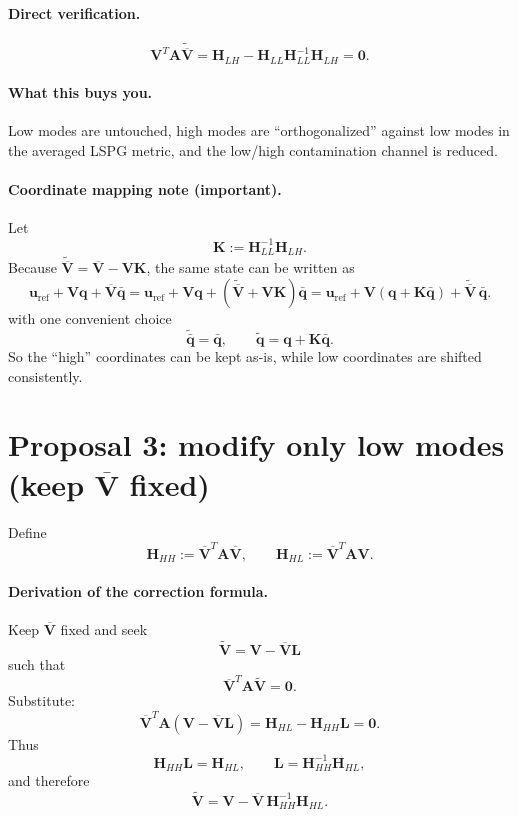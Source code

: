 \documentclass[11pt]{article}
\begin{document}
\paragraph{Direct verification.}
\[
\mathbf V^T\mathbf A\widetilde{\overline{\mathbf V}}
=
\mathbf H_{LH}-\mathbf H_{LL}\mathbf H_{LL}^{-1}\mathbf H_{LH}
=
\mathbf0.
\]

\paragraph{What this buys you.}
Low modes are untouched, high modes are ``orthogonalized'' against low modes in the averaged LSPG metric, and the low/high contamination channel is reduced.

\paragraph{Coordinate mapping note (important).}
Let
\[
\mathbf K:=\mathbf H_{LL}^{-1}\mathbf H_{LH}.
\]
Because $\widetilde{\overline{\mathbf V}}=\overline{\mathbf V}-\mathbf V\mathbf K$, the same state can be written as
\[
\mathbf u_{\mathrm{ref}}+\mathbf V\mathbf q+\overline{\mathbf V}\bar{\mathbf q}
=
\mathbf u_{\mathrm{ref}}+\mathbf V\mathbf q+\left(\widetilde{\overline{\mathbf V}}+\mathbf V\mathbf K\right)\bar{\mathbf q}
=
\mathbf u_{\mathrm{ref}}+\mathbf V\left(\mathbf q+\mathbf K\bar{\mathbf q}\right)+\widetilde{\overline{\mathbf V}}\,\bar{\mathbf q}.
\]
with one convenient choice
\[
\widetilde{\bar{\mathbf q}}=\bar{\mathbf q},
\qquad
\widetilde{\mathbf q}=\mathbf q+\mathbf K\bar{\mathbf q}.
\]
So the ``high'' coordinates can be kept as-is, while low coordinates are shifted consistently.

\section{Proposal 3: modify only low modes (keep $\overline{\mathbf V}$ fixed)}
Define
\[
\mathbf H_{HH}:=\overline{\mathbf V}^T\mathbf A\overline{\mathbf V},
\qquad
\mathbf H_{HL}:=\overline{\mathbf V}^T\mathbf A\mathbf V.
\]
\paragraph{Derivation of the correction formula.}
Keep $\overline{\mathbf V}$ fixed and seek
\[
\widetilde{\mathbf V}=\mathbf V-\overline{\mathbf V}\mathbf L
\]
such that
\[
\overline{\mathbf V}^T\mathbf A\widetilde{\mathbf V}=\mathbf0.
\]
Substitute:
\[
\overline{\mathbf V}^T\mathbf A(\mathbf V-\overline{\mathbf V}\mathbf L)
=
\mathbf H_{HL}-\mathbf H_{HH}\mathbf L
=
\mathbf0.
\]
Thus
\[
\mathbf H_{HH}\mathbf L=\mathbf H_{HL},
\qquad
\mathbf L=\mathbf H_{HH}^{-1}\mathbf H_{HL},
\]
and therefore
\[
\widetilde{\mathbf V}
=
\mathbf V
-\overline{\mathbf V}\,\mathbf H_{HH}^{-1}\mathbf H_{HL}.
\]
\end{document}
